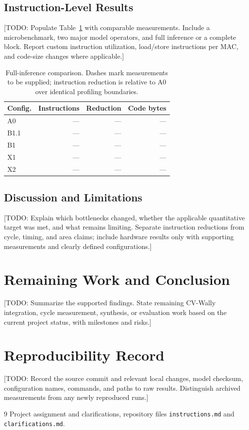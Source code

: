 \documentclass[10pt,a4paper,twocolumn]{article}
\newcommand{\todo}[1]{\textcolor{blue!60!black}{[TODO: #1]}}
\begin{document}
\subsection{Instruction-Level Results}
\todo{Populate Table~\ref{tab:results} with comparable measurements. Include a
microbenchmark, two major model operators, and full inference or a complete
block. Report custom instruction utilization, load/store instructions per MAC,
and code-size changes where applicable.}

\begin{table}[t]
\centering
\caption{Full-inference comparison. Dashes mark measurements to be supplied;
instruction reduction is relative to A0 over identical profiling boundaries.}
\label{tab:results}
\small
\begin{tabular}{lrrr}
\toprule
Config. & Instructions & Reduction & Code bytes \\
\midrule
A0 & --- & --- & --- \\
B1.1 & --- & --- & --- \\
B1 & --- & --- & --- \\
X1 & --- & --- & --- \\
X2 & --- & --- & --- \\
\bottomrule
\end{tabular}
\end{table}

\subsection{Discussion and Limitations}
\todo{Explain which bottlenecks changed, whether the applicable quantitative
target was met, and what remains limiting. Separate instruction reductions from
cycle, timing, and area claims; include hardware results only with supporting
measurements and clearly defined configurations.}

\section{Remaining Work and Conclusion}
\label{sec:conclusion}
\todo{Summarize the supported findings. State remaining CV-Wally integration,
cycle measurement, synthesis, or evaluation work based on the current project
status, with milestones and risks.}

\appendix
\section{Reproducibility Record}
\label{sec:reproduction}
\todo{Record the source commit and relevant local changes, model checksum,
configuration names, commands, and paths to raw results. Distinguish archived
measurements from any newly reproduced runs.}

\begin{thebibliography}{9}
Project assignment and clarifications, repository files
\texttt{instructions.md} and \texttt{clarifications.md}.
\end{thebibliography}
\end{document}
